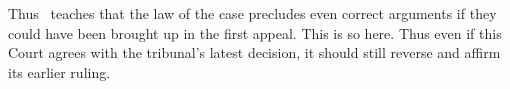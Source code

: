 \documentclass[12pt,\documentclassflag]{michiganCourtOfAppealsBrief}
\begin{document}


Thus \cite[s]{Bennett}\ teaches that the law of the case precludes even correct arguments if they could have been brought up in the first appeal. This is so here. Thus even if this Court agrees with the tribunal's latest decision,
it should still reverse and affirm its earlier ruling.




\end{document}

